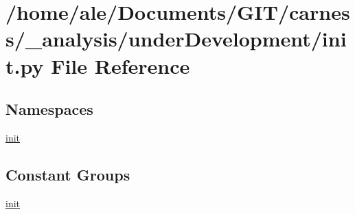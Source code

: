 \hypertarget{a00042}{\section{/home/ale/\-Documents/\-G\-I\-T/carness/\-\_\-analysis/under\-Development/init.py File Reference}
\label{a00042}
}
\subsection*{Namespaces}
\begin{DoxyCompactItemize}
\item 
\hyperlink{a00101}{init}
\end{DoxyCompactItemize}
\subsection*{Constant Groups}
\begin{DoxyCompactItemize}
\item 
\hyperlink{a00101}{init}
\end{DoxyCompactItemize}
